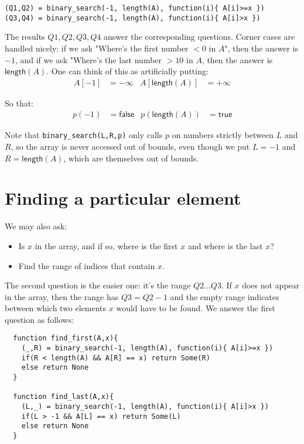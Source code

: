 \documentclass[a4paper, 11pt]{article}
\begin{document}
\begin{lstlisting}
(Q1,Q2) = binary_search(-1, length(A), function(i){ A[i]>=x })
(Q3,Q4) = binary_search(-1, length(A), function(i){ A[i]>x })
\end{lstlisting}

\noindent The results $Q1,Q2,Q3,Q4$ answer the corresponding questions. Corner cases are handled nicely: if we ask "Where's the first number $<0$ in $A$", then the answer is $-1$, and if we ask "Where's the last number $>10$ in $A$, then the answer is $\mathsf{length}(A)$. One can think of this as artificially putting:
\begin{align*}
  A[-1] &= -\infty & A[\mathsf{length}(A)] &= +\infty
\end{align*}

So that:
\begin{align*}
  p(-1) &= \mathsf{false} & p(\mathsf{length}(A)) &= \mathsf{true}
\end{align*}

Note that \lstinline|binary_search(L,R,p)| only calls $p$ on numbers strictly between $L$ and $R$, so the array is never accessed out of bounds, even though we put $L=-1$ and $R=\mathsf{length}(A)$, which are themselves out of bounds.

\section{Finding a particular element}

We may also ask:

\begin{itemize}
  \item Is $x$ in the array, and if so, where is the first $x$ and where is the last $x$?
  \item Find the range of indices that contain $x$.
\end{itemize}

\noindent The second question is the easier one: it's the range $Q2\dots Q3$. If $x$ does not appear in the array, then the range has $Q3 = Q2 - 1$ and the empty range indicates between which two elements $x$ would have to be found. We answer the first question as follows:

\begin{lstlisting}
  function find_first(A,x){
    (_,R) = binary_search(-1, length(A), function(i){ A[i]>=x })
    if(R < length(A) && A[R] == x) return Some(R)
    else return None
  }

  function find_last(A,x){
    (L,_) = binary_search(-1, length(A), function(i){ A[i]>x })
    if(L > -1 && A[L] == x) return Some(L)
    else return None
  }
\end{lstlisting}
\end{document}
